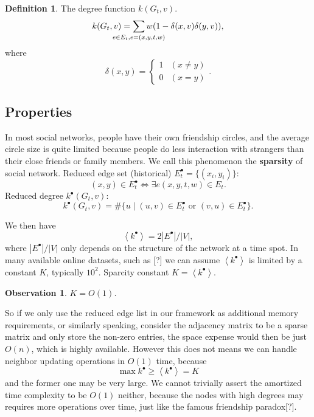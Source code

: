 \documentclass[12pt,abstract=true]{scrartcl}
\numberwithin{equation}{section}
\theoremstyle{definition}   \newtheorem{definition}{Definition}[section]
\theoremstyle{plain}        \newtheorem{theorem}{Theorem}[section]
\theoremstyle{plain}        \newtheorem{observation}{Observation}[section]
\theoremstyle{plain}        \newtheorem{fact}{Fact}[section]
\theoremstyle{plain}        \newtheorem{claim}{Claim}[section]
\theoremstyle{plain}        \newtheorem{lemma}[theorem]{Lemma}
\theoremstyle{plain}        \newtheorem{corollary}[theorem]{Corollary}
\theoremstyle{remark}       \newtheorem{example}{Example}[section]
\theoremstyle{remark}       \newtheorem{remark}{Remark}[section]
\begin{document}
\begin{definition}
The degree function $k(G_t,v)$.
\begin{equation}
k(G_t,v)=\sum_{\mathclap{e\in E_t, e=(x,y,t,w)}}w(1-\delta(x,v)\delta(y,v)),
\end{equation}
where \begin{equation}
\delta(x,y)=\begin{cases}1&(x\neq y)\\0&(x=y)\end{cases}.
\end{equation}
\end{definition}

\subsection{Properties}
In most social networks, people have their own friendship circles, and the
average circle size is quite limited because people do less interaction with
strangers than their close friends or family members. We call this phenomenon
the \textbf{sparsity} of social network.
 Reduced edge set (historical) $E_t^\bullet=\{(x_i,y_i)\}$:
\begin{equation}
(x,y)\in E_t^\bullet \iff \exists e(x,y,t,w)\in E_t.
\end{equation}
 Reduced degree $k^\bullet(G_t,v)$:
\begin{equation}
k^\bullet(G_t,v)=\#\{u\;|\;(u,v)\in E_t^\bullet\text{ or }(v,u)\in
E_t^\bullet\}.
\end{equation}

We then have
\begin{equation}
\left<k^\bullet\right>=2\left|E^\bullet\right|/\left|V\right|,
\end{equation}
where $\left|E^\bullet\right|/\left|V\right|$ only depends on the structure of
the network at a time spot. In many available online datasets, such as [?]%
we can assume $\left<k^\bullet\right>$ is limited by a constant $K$, typically
$10^2$.
 Sparcity constant $K=\left<k^\bullet\right>$.

\begin{observation} $K=O(1)$.
\end{observation}
So if we only use the reduced edge list in our framework as additional memory
requirements, or similarly speaking, consider the adjacency matrix to be a
sparse matrix and only store the non-zero entries, the space expense would then
be just $O(n)$, which is highly available. However this does not means we can
handle neighbor updating operations in $O(1)$ time, because
\begin{equation}\max k^\bullet\geq
\left<k^\bullet\right>=K \end{equation} and the former one may be very large.
We cannot trivially assert the amortized time complexity to be $O(1)$ neither,
because the nodes with high degrees may requires more operations over time,
just like the famous friendship paradox[?].
\end{document}
